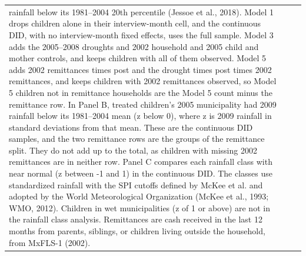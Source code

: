 \documentclass[12pt]{article}
\begin{document}
\begin{longtable}{@{\extracolsep{\fill}}lcc}
{rainfall below its 1981--2004 20th percentile (Jessoe et al., 2018). Model 1 drops children alone in their interview-month cell, and the continuous DID, with no interview-month fixed effects, uses the full sample. Model 3 adds the 2005--2008 droughts and 2002 household
and 2005 child and mother controls, and keeps children with all of them observed. Model 5 adds 2002 remittances times post and the drought times post times 2002 remittances, and keeps children
with 2002 remittances observed, so Model 5 children not in remittance households are the Model 5 count minus the remittance row. In Panel B, treated children's 2005 municipality had 2009
rainfall below its 1981--2004 mean (z below 0), where z is 2009 rainfall in standard deviations from that mean. These are the continuous DID samples, and the two remittance rows are the groups
of the remittance split. They do not add up to the total, as children with missing 2002 remittances are in neither row. Panel C compares each rainfall class with near normal (z between -1 and 1)
in the continuous DID. The classes use standardized rainfall with the SPI cutoffs defined by McKee et al. and adopted by the World Meteorological Organization (McKee et al., 1993; WMO, 2012). Children in wet municipalities (z of 1 or above)
are not in the rainfall class analysis. Remittances are cash received in the last 12 months
from parents, siblings, or children living outside the household, from MxFLS-1 (2002).}\\
\end{longtable}
\endgroup
\clearpage
\begingroup
\footnotesize
\renewcommand{\arraystretch}{0.86}
\setlength{\tabcolsep}{4pt}
\setlength{\LTcapwidth}{\textwidth}
\setlength{\LTleft}{0pt}
\setlength{\LTright}{0pt plus 1fil}
\end{document}
